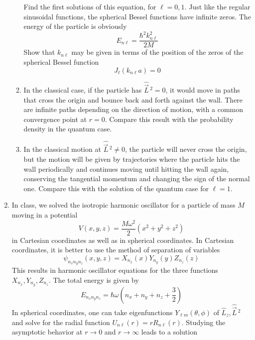 \documentclass[../psets.tex]{subfiles}
\begin{document}
\begin{enumerate}
\begin{enumerate}
        Find the first solutions of this equation, for $\ell=0,1$. Just like the regular sinusoidal functions, the spherical Bessel functions have infinite zeros. The energy of the particle is obviously
        \begin{equation}
            E_{n\ell} = \frac{\hbar^2k_{n\ell}^2}{2M}
        \end{equation}
        Show that $k_{n\ell}$ may be given in terms of the position of the zeros of the spherical Bessel function
        \begin{equation}
            J_\ell(k_{n\ell}a) = 0
        \end{equation}
        \item In the classical case, if the particle has $\hat{\vec{L}}{\,}^2=0$, it would move in paths that cross the origin and bounce back and forth against the wall. There are infinite paths depending on the direction of motion, with a common convergence point at $r=0$. Compare this result with the probability density in the quantum case.
        \item In the classical motion at $\hat{\vec{L}}{\,}^2\neq 0$, the particle will never cross the origin, but the motion will be given by trajectories where the particle hits the wall periodically and continues moving until hitting the wall again, conserving the tangential momentum and changing the sign of the normal one. Compare this with the solution of the quantum case for $\ell=1$.
    \end{enumerate}
    \item In class, we solved the isotropic harmonic oscillator for a particle of mass $M$ moving in a potential
    \begin{equation}
        V(x,y,z) = \frac{M\omega^2}{2}(x^2+y^2+z^2)
    \end{equation}
    in Cartesian coordinates as well as in spherical coordinates. In Cartesian coordinates, it is better to use the method of separation of variables
    \begin{equation}
        \psi_{n_xn_yn_z}(x,y,z) = X_{n_x}(x)Y_{n_y}(y)Z_{n_z}(z)
    \end{equation}
    This results in harmonic oscillator equations for the three functions $X_{n_x},Y_{n_y},Z_{n_z}$. The total energy is given by
    \begin{equation}
        E_{n_xn_yn_z} = \hbar\omega\left( n_x+n_y+n_z+\frac{3}{2} \right)
    \end{equation}
    In spherical coordinates, one can take eigenfunctions $Y_{\ell m}(\theta,\phi)$ of $\hat{L}_z,\hat{\vec{L}}{\,}^2$ and solve for the radial function $U_{n\ell}(r)=rR_{n\ell}(r)$. Studying the asymptotic behavior at $r\to 0$ and $r\to\infty$ leads to a solution

\end{enumerate}
\end{document}
